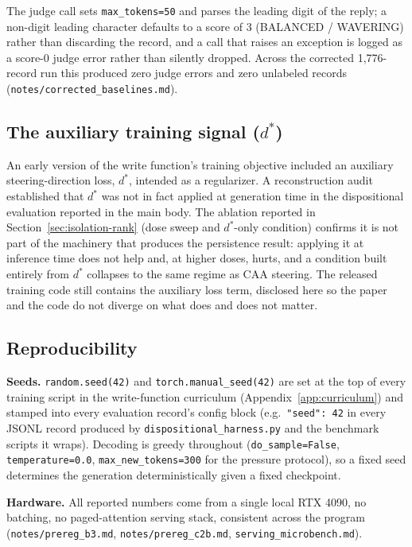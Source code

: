 The judge call sets \texttt{max\_tokens=50} and parses the leading digit of the reply;
a non-digit leading character defaults to a score of 3 (BALANCED / WAVERING) rather than
discarding the record, and a call that raises an exception is logged as a score-0 judge
error rather than silently dropped. Across the corrected 1,776-record run this produced
zero judge errors and zero unlabeled records (\texttt{notes/corrected\_baselines.md}).

\subsection{The auxiliary training signal ($d^*$)}
\label{app:dstar}
An early version of the write function's training objective included an auxiliary
steering-direction loss, $d^*$, intended as a regularizer. A reconstruction audit
established that $d^*$ was not in fact applied at generation time in the dispositional
evaluation reported in the main body. The ablation reported in
Section~\ref{sec:isolation-rank} (dose sweep and $d^*$-only condition) confirms it is
not part of the machinery that produces the persistence result: applying it at
inference time does not help and, at higher doses, hurts, and a condition built
entirely from $d^*$ collapses to the same regime as CAA steering. The released training
code still contains the auxiliary loss term, disclosed here so the paper and the code
do not diverge on what does and does not matter.

\subsection{Reproducibility}
\label{app:repro}

\textbf{Seeds.} \texttt{random.seed(42)} and \texttt{torch.manual\_seed(42)} are set at
the top of every training script in the write-function curriculum
(Appendix~\ref{app:curriculum}) and stamped into every evaluation record's config block
(e.g.\ \texttt{"seed": 42} in every JSONL record produced by
\texttt{dispositional\_harness.py} and the benchmark scripts it wraps). Decoding is
greedy throughout (\texttt{do\_sample=False}, \texttt{temperature=0.0},
\texttt{max\_new\_tokens=300} for the pressure protocol), so a fixed seed determines the
generation deterministically given a fixed checkpoint.

\textbf{Hardware.} All reported numbers come from a single local RTX 4090, no batching,
no paged-attention serving stack, consistent across the program
(\texttt{notes/prereg\_b3.md}, \texttt{notes/prereg\_c2b.md},
\texttt{serving\_microbench.md}).

